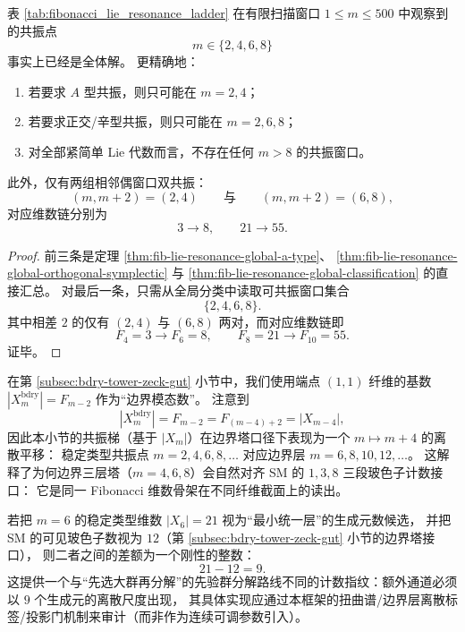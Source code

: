 \begin{corollary}[表 \ref{tab:fibonacci_lie_resonance_ladder} 的全局闭合与共振梯在 \(m=8\) 处终止]\label{cor:fib-lie-resonance-ladder-global-closure}
表 \ref{tab:fibonacci_lie_resonance_ladder} 在有限扫描窗口 \(1\le m\le 500\) 中观察到的共振点
\[
m\in\{2,4,6,8\}
\]
事实上已经是全体解。
更精确地：
\begin{enumerate}
  \item 若要求 \(A\) 型共振，则只可能在 \(m=2,4\)；
  \item 若要求正交/辛型共振，则只可能在 \(m=2,6,8\)；
  \item 对全部紧简单 Lie 代数而言，不存在任何 \(m>8\) 的共振窗口。
\end{enumerate}
此外，仅有两组相邻偶窗口双共振：
\[
(m,m+2)=(2,4)
\qquad\text{与}\qquad
(m,m+2)=(6,8),
\]
对应维数链分别为
\[
3\to 8,
\qquad
21\to 55.
\]
\end{corollary}
\begin{proof}
前三条是定理 \ref{thm:fib-lie-resonance-global-a-type}、
\ref{thm:fib-lie-resonance-global-orthogonal-symplectic} 与
\ref{thm:fib-lie-resonance-global-classification} 的直接汇总。
对最后一条，只需从全局分类中读取可共振窗口集合
\[
\{2,4,6,8\}.
\]
其中相差 \(2\) 的仅有 \((2,4)\) 与 \((6,8)\) 两对，而对应维数链即
\[
F_4=3\to F_6=8,
\qquad
F_8=21\to F_{10}=55.
\]
证毕。
\end{proof}

\begin{remark}[与边界词塔的四步平移]\label{rem:fib-lie-resonance-shift-by-4}
在第 \ref{subsec:bdry-tower-zeck-gut} 小节中，我们使用端点 \((1,1)\) 纤维的基数
\(
|X_m^{\mathrm{bdry}}|=F_{m-2}
\)
作为“边界模态数”。
注意到
\[
|X_m^{\mathrm{bdry}}|=F_{m-2}=F_{(m-4)+2}=|X_{m-4}|,
\]
因此本小节的共振梯（基于 \(|X_m|\)）在边界塔口径下表现为一个 \(m\mapsto m+4\) 的离散平移：
稳定类型共振点 \(m=2,4,6,8,\dots\) 对应边界层 \(m=6,8,10,12,\dots\)。
这解释了为何边界三层塔（\(m=4,6,8\)）会自然对齐 SM 的 \(1,3,8\) 三段玻色子计数接口：
它是同一 Fibonacci 维数骨架在不同纤维截面上的读出。
\end{remark}

\begin{remark}[最小额外生成元计数：\(21-12=9\)]\label{rem:fib-lie-extra-9}
若把 \(m=6\) 的稳定类型维数 \( |X_6|=21 \) 视为“最小统一层”的生成元数候选，
并把 SM 的可见玻色子数视为 \(12\)（第 \ref{subsec:bdry-tower-zeck-gut} 小节的边界塔接口），
则二者之间的差额为一个刚性的整数：
\[
21-12=9.
\]
这提供一个与“先选大群再分解”的先验群分解路线不同的计数指纹：额外通道必须以 \(9\) 个生成元的离散尺度出现，
其具体实现应通过本框架的扭曲谱/边界层离散标签/投影门机制来审计（而非作为连续可调参数引入）。
\end{remark}

